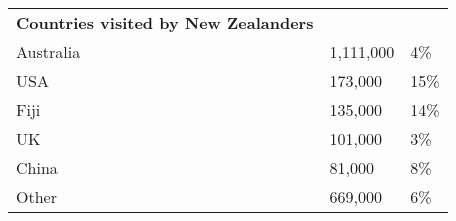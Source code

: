 \begin{tabular}[t]{p{4.7cm}>{\hfill}p{1.1cm}>{\hfill}p{1.7cm}}
 \textbf{Countries visited by New Zealanders} &   &   \\ 
 Australia & 1,111,000 & 4\% \\ 
  USA &   173,000 & 15\% \\ 
  Fiji &   135,000 & 14\% \\ 
  UK &   101,000 & 3\% \\ 
  China &    81,000 & 8\% \\ 
  Other &   669,000 & 6\% \\ 
  \end{tabular}

